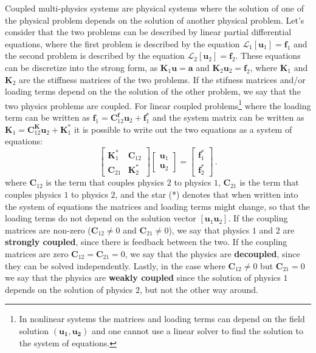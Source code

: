     Coupled multi-physics systems are physical systems where the solution of one of
    the physical
    problem depends on the solution of another physical problem. Let's consider
    that the two
    problems can be described by linear partial differential equations, where the
    first problem
    is described by the equation $\mathcal{L}_1 [\mathbf{u}_1]= \mathbf{f}_1$ and
    the second problem is described by the
    equation $\mathcal{L}_2 [\mathbf{u}_2]= \mathbf{f}_2$. These equations can be
    discretize into the strong form,
    as $\mathbf{K}_1 \mathbf{u} = \mathbf{a}$ and $\mathbf{K}_2 \mathbf{u}_2 =
\mathbf{f}_2$, where $\mathbf{K}_1$ and $\mathbf{K}_2$ are the stiffness
    matrices of the two problems.
    If the stifness matrices and/or loading terms depend on the the solution of the
    other problem, we say that the two physics problems are
    coupled. For linear coupled problems\footnote{In nonlinear systems the matrices
        and loading terms can depend on the field solution $(\mathbf{u_1},
            \mathbf{u_2})$
        and one cannot use a linear solver to find the solution to the system of
        equations.} where the loading term can be written as
$\mathbf{f}_1=\mathbf{C}^{\mathbf{f}}_{12}\mathbf{u}_2 + \mathbf{f}_1^*$ and
    the system matrix can be written as
$\mathbf{K}_1=\mathbf{C}^{\mathbf{K}}_{12}\mathbf{u}_2 + \mathbf{K}_1^*$
    it is possible to write out the two equations as a system of equations:
    \begin{equation}
        \begin{bmatrix}
            \mathbf{K}^*_1  & \mathbf{C}_{12} \\
            \mathbf{C}_{21} & \mathbf{K}^*_2
        \end{bmatrix}
        \begin{bmatrix}
            \mathbf{u}_1 \\
            \mathbf{u}_2
        \end{bmatrix}
        =
        \begin{bmatrix}
            \mathbf{f}_1^* \\
            \mathbf{f}_2^*
        \end{bmatrix}\,.
    \end{equation}
    where $\mathbf{C}_{12}$ is the term that couples physics $2$ to physics $1$,
$\mathbf{C}_{21}$ is the term that couples physics $1$ to physics $2$, and the
    star (*) denotes that when written into the system of equations
    the matrices and loading terms might change, so that the loading terms do not
    depend on the solution vector $[\mathbf{u}_1 \mathbf{u}_2]$. If the coupling
    matrices are non-zero ($\mathbf{C}_{12}\neq 0$ and $\mathbf{C}_{21}\neq 0$), we
    say that physics $1$ and $2$ are
    \textbf{strongly coupled}, since there is feedback between the two. If the
    coupling matrices are zero $\mathbf{C}_{12}=\mathbf{C}_{21}=0$, we say that the
    physics
    are \textbf{decoupled}, since they can be solved independently. Lastly, in the
    case where $\mathbf{C}_{12}\neq 0$ but $\mathbf{C}_{21} = 0$ we say that the
    physics are \textbf{weakly
        coupled} since the solution of physics $1$ depends on the solution of physics
$2$, but not the other way around.

